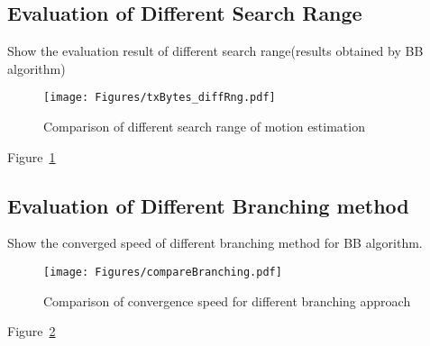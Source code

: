 \subsection{Evaluation of Different Search Range}
{\color{red}Show the evaluation result of different search range(results obtained by BB algorithm)}
%
\begin{figure}
\begin{center}
\texttt{[image: Figures/txBytes\_diffRng.pdf]}
\caption{\label{fig::txBytes_diffRng} Comparison of different search range of motion estimation}
\end{center}
\end{figure}
Figure~\ref{fig::txBytes_diffRng}

\subsection{Evaluation of Different Branching method}
{\color{red}Show the converged speed of different branching method for BB algorithm.}
\begin{figure}
\begin{center}
\texttt{[image: Figures/compareBranching.pdf]}
\caption{\label{fig::compareBranching} Comparison of convergence speed for different branching approach}
\end{center}
\end{figure}
Figure~\ref{fig::compareBranching}

